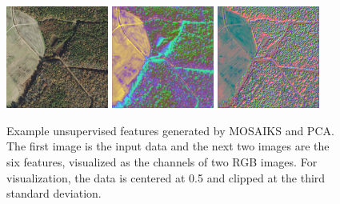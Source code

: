 \begin{figure}
    \centering
    \includegraphics[width=0.3\textwidth]{figs/methods/IPP/img_for_features.png}
    \includegraphics[width=0.3\textwidth]{figs/methods/IPP/first_three_feaures.png}
    \includegraphics[width=0.3\textwidth]{figs/methods/IPP/second_three_features.png}
    \caption{Example unsupervised features generated by MOSAIKS and PCA. The first image is the input data and the next two images are the six features, visualized as the channels of two RGB images. For visualization, the data is centered at 0.5 and clipped at the third standard deviation.}
    \label{fig:methods:unsupervised_features}
\end{figure}



